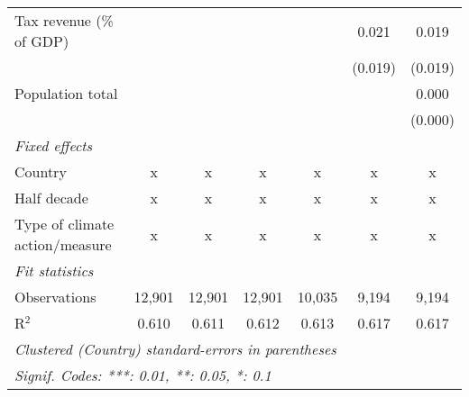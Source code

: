 \begin{tabular}{lcccccc}
   Tax revenue (\% of GDP)                    &         &               &                &                & 0.021          & 0.019\\   
                                              &         &               &                &                & (0.019)        & (0.019)\\   
   Population total                           &         &               &                &                &                & 0.000\\   
                                              &         &               &                &                &                & (0.000)\\   
   \emph{Fixed effects}\\
   Country                                    & x       & x             & x              & x              & x              & x\\  
   Half decade                                & x       & x             & x              & x              & x              & x\\  
   Type of climate action/measure             & x       & x             & x              & x              & x              & x\\  
   \midrule \emph{Fit statistics}\\
   Observations                               & 12,901  & 12,901        & 12,901         & 10,035         & 9,194          & 9,194\\  
   R$^2$                                      & 0.610   & 0.611         & 0.612          & 0.613          & 0.617          & 0.617\\  
   \midrule
   \multicolumn{7}{l}{\emph{Clustered (Country) standard-errors in parentheses}}\\
   \multicolumn{7}{l}{\emph{Signif. Codes: ***: 0.01, **: 0.05, *: 0.1}}\\
\end{tabular}
\par\endgroup


